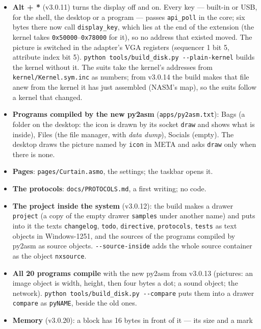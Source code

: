\documentclass[11pt,a4paper]{article}
\newcommand{\file}[1]{\texttt{#1}}
\newcommand{\cmd}[1]{\texttt{#1}}
\begin{document}
\begin{itemize}
\item \textbf{Alt + *} (v3.0.11) turns the display off and on. Every key --- built-in or USB,
      for the shell, the desktop or a program --- passes \texttt{api\_poll} in the core; six
      bytes there now call \texttt{display\_key}, which lies at the end of the extension (the
      kernel takes \texttt{0x50000}--\texttt{0x78000} for it), so no address that existed
      moved. The picture is switched in the adapter's VGA registers (sequencer 1 bit 5,
      attribute index bit 5). \cmd{python tools/build\_disk.py -{}-plain-kernel} builds the
      kernel without it. The suits take the kernel's addresses from
      \file{kernel/Kernel.sym.inc} as numbers; from v3.0.14 the build makes that file anew from
      the kernel it has just assembled (NASM's map), so the suits follow a kernel that changed.
\item \textbf{Programs compiled by the new py2asm} (\file{apps/py2asm.txt}): Bags (a folder on
      the desktop: the icon is drawn by its socket \texttt{draw} and shows what is inside),
      Files (the file manager, with \emph{data dump}), Socials (empty). The desktop draws the
      picture named by \texttt{icon} in META and asks \texttt{draw} only when there is none.
\item \textbf{Pages}: \file{pages/Curtain.asmo}, the settings; the taskbar opens it.
\item \textbf{The protocols}: \file{docs/PROTOCOLS.md}, a first writing; no code.
\item \textbf{The project inside the system} (v3.0.12): the build makes a drawer
      \texttt{project} (a copy of the empty drawer \texttt{samples} under another name) and
      puts into it the texts \texttt{changelog}, \texttt{todo}, \texttt{directive},
      \texttt{protocols}, \texttt{tests} as text objects in Windows-1251, and the sources of the
      programs compiled by py2asm as source objects. \texttt{-{}-source-inside} adds the whole
      source container as the object \texttt{nxsource}.
\item \textbf{All 20 programs compile} with the new py2asm from v3.0.13 (pictures: an image
      object is width, height, then four bytes a dot; a sound object; the network).
      \cmd{python tools/build\_disk.py -{}-compare} puts them into a drawer \texttt{compare} as
      \texttt{pyNAME}, beside the old ones.
\item \textbf{Memory} (v3.0.20): a block has 16 bytes in front of it --- its size and a mark

\end{itemize}
\end{document}

